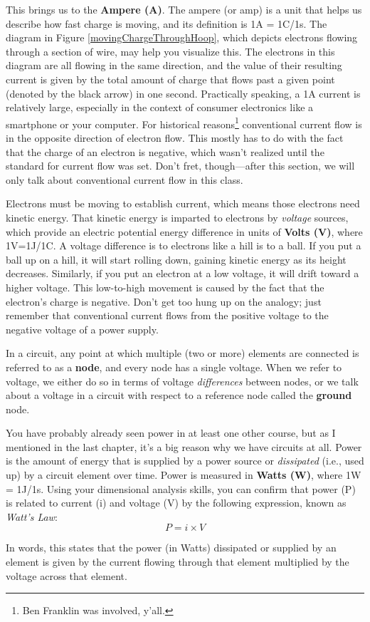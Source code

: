 This brings us to the \textbf{Ampere (A)}. The ampere (or amp) is a unit that helps us describe how fast charge is moving, and its definition is 1A = 1C/1s. The diagram in Figure \ref{movingChargeThroughHoop}, which depicts electrons flowing through a section of wire, may help you visualize this. The electrons in this diagram are all flowing in the same direction, and the value of their resulting current is given by the total amount of charge that flows past a given point (denoted by the black arrow) in one second. Practically speaking, a 1A current is relatively large, especially in the context of consumer electronics like a smartphone or your computer. For historical reasons\footnote{Ben Franklin was involved, y'all.} conventional current flow is in the opposite direction of electron flow. This mostly has to do with the fact that the charge of an electron is negative, which wasn't realized until the standard for current flow was set. Don't fret, though---after this section, we will only talk about conventional current flow in this class. 
\par
Electrons must be moving to establish current, which means those electrons need kinetic energy. That kinetic energy is imparted to electrons by \textit{voltage} sources, which provide an electric potential energy difference in units of \textbf{Volts (V)}, where 1V=1J/1C. A voltage difference is to electrons like a hill is to a ball. If you put a ball up on a hill, it will start rolling down, gaining kinetic energy as its height decreases. Similarly, if you put an electron at a low voltage, it will drift toward a higher voltage. This low-to-high movement is caused by the fact that the electron's charge is negative. Don't get too hung up on the analogy; just remember that conventional current flows from the positive voltage to the negative voltage of a power supply. 
\par
In a circuit, any point at which multiple (two or more) elements are connected is referred to as a \textbf{node}, and every node has a single voltage. When we refer to voltage, we either do so in terms of voltage \textit{differences} between nodes, or we talk about a voltage in a circuit with respect to a reference node called the \textbf{ground} node.
\par
You have probably already seen power in at least one other course, but as I mentioned in the last chapter, it's a big reason why we have circuits at all. Power is the amount of energy that is supplied by a power source or \textit{dissipated} (i.e., used up) by a circuit element over time. Power is measured in \textbf{Watts (W)}, where 1W = 1J/1s. Using your dimensional analysis skills, you can confirm that power (P) is related to current (i) and voltage (V) by the following expression, known as \textit{Watt's Law}:
$$
P = i\times V
$$
\par
In words, this states that the power (in Watts) dissipated or supplied by an element is given by the current flowing through that element multiplied by the voltage across that element. 

